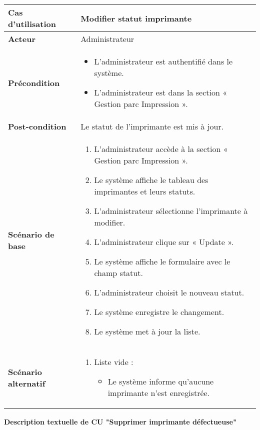 \documentclass[a4paper,11pt]{report}
\begin{document}
\begin{tabularx}{\textwidth}{|>{\bfseries}l|X|}
\hline
Cas d’utilisation    & Modifier statut imprimante \\
\hline
Acteur               & Administrateur \\
\hline
Précondition         &
\begin{itemize}[left=0pt]
  \item L’administrateur est authentifié dans le système.
  \item  L’administrateur est dans la section « Gestion parc Impression ».
\end{itemize} \\
\hline
Post-condition       & Le statut de l’imprimante est mis à jour. \\
\hline
Scénario de base     &
\begin{enumerate}[left=0pt]
  \item L’administrateur accède à la section « Gestion parc Impression ».
  \item Le système affiche le tableau des imprimantes et leurs statuts.
  \item L’administrateur sélectionne l’imprimante à modifier.
  \item  L’administrateur clique sur « Update ».
  \item Le système affiche le formulaire avec le champ statut.
  \item  L’administrateur choisit le nouveau statut.
  \item Le système enregistre le changement.
  \item Le système met à jour la liste.
\end{enumerate} \\
\hline
Scénario alternatif   &
\begin{enumerate}[label=\arabic*.a,wide=0pt]
  \item Liste vide :
    \begin{itemize}[left=1em]
      \item Le système informe qu’aucune imprimante n’est enregistrée.
    \end{itemize}
\end{enumerate} \\
\hline
\end{tabularx}


\textbf{Description textuelle de CU "Supprimer imprimante défectueuse"}
\end{document}
